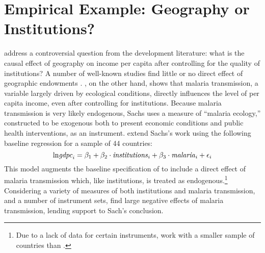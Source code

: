 \section{Empirical Example: Geography or Institutions?}
\label{sec:application}
\cite{Carstensen2006} address a controversial question from the development literature: what is the causal effect of geography on income per capita after controlling for the quality of institutions?
A number of well-known studies find little or no direct effect of geographic endowments \citep{Acemoglu,Rodrik,Easterly}. \cite{Sachs}, on the other hand, shows that malaria transmission, a variable largely driven by ecological conditions, directly influences the level of per capita income, even after controlling for institutions.
Because malaria transmission is very likely endogenous, Sachs uses a measure of ``malaria ecology,'' constructed to be exogenous both to present economic conditions and public health interventions, as an instrument. 
\cite{Carstensen2006} extend Sachs's work using the following baseline regression for a sample of 44 countries:
\begin{equation}
	\mbox{ln\emph{gdpc}}_i = \beta_1 + \beta_2 \cdot \mbox{\emph{institutions}}_i + \beta_3 \cdot \mbox{\emph{malaria}}_i + \epsilon_i
\end{equation}
This model augments the baseline specification of \cite{Acemoglu} to include a direct effect of malaria transmission which, like institutions, is treated as endogenous.\footnote{Due to a lack of data for certain instruments, \cite{Carstensen2006} work with a smaller sample of countries than \cite{Acemoglu}.} 
Considering a variety of measures of both institutions and malaria transmission, and a number of instrument sets, \cite{Carstensen2006} find large negative effects of malaria transmission, lending support to Sach's conclusion.

